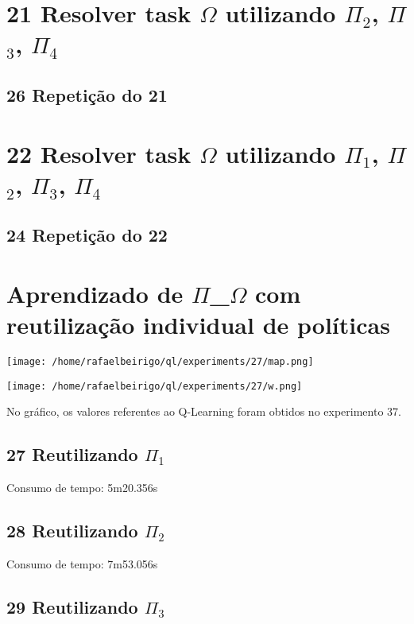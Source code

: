 \documentclass[11pt]{article}
\begin{document}
\section{21 Resolver task $\Omega$ utilizando $\Pi$$_2$, $\Pi$$_3$, $\Pi$$_4$}
\label{sec-7}

\subsection{26 Repetição do 21}
\label{sec-7.1}




\section{22 Resolver task $\Omega$ utilizando $\Pi$$_1$, $\Pi$$_2$, $\Pi$$_3$, $\Pi$$_4$}
\label{sec-8}

\subsection{24 Repetição do 22}
\label{sec-8.1}



\section{Aprendizado de $\Pi$_$\Omega$ com reutilização individual de políticas}
\label{sec-9}

\centerline{\texttt{[image: /home/rafaelbeirigo/ql/experiments/27/map.png]}}


\centerline{\texttt{[image: /home/rafaelbeirigo/ql/experiments/27/w.png]}}


No gráfico, os valores referentes ao Q-Learning foram obtidos no experimento 37.

\subsection{27 Reutilizando $\Pi$$_1$}
\label{sec-9.1}

Consumo de tempo: 5m20.356s
\subsection{28 Reutilizando $\Pi$$_2$}
\label{sec-9.2}

Consumo de tempo: 7m53.056s
\subsection{29 Reutilizando $\Pi$$_3$}
\label{sec-9.3}
\end{document}
